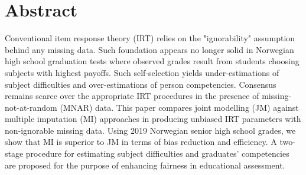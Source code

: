 \section{Abstract}

Conventional item response theory (IRT) relies on the "ignorability" assumption behind any missing data. Such foundation appears no longer solid in Norwegian high school graduation tests where observed grades result from students choosing subjects with highest payoffs. Such self-selection yields under-estimations of subject difficulties and over-estimations of person competencies. Consensus remains scarce over the appropriate IRT procedures in the presence of missing-not-at-random (MNAR) data. This paper compares joint modelling (JM) against multiple imputation (MI) approaches in producing unbiased IRT parameters with non-ignorable missing data. Using 2019 Norwegian senior high school grades, we show that MI is superior to JM in terms of bias reduction and efficiency. A two-stage procedure for estimating subject difficulties and graduates' competencies are proposed for the purpose of enhancing fairness in educational assessment.



